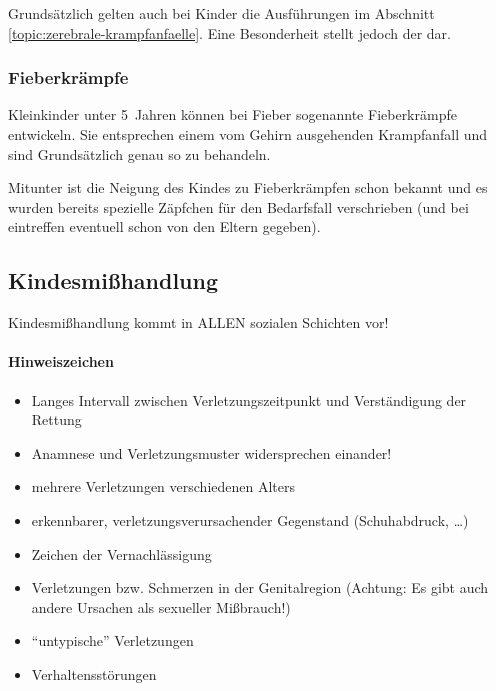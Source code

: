 Grundsätzlich gelten auch bei Kinder die Ausführungen im Abschnitt
\ref{topic:zerebrale-krampfanfaelle}. Eine Besonderheit stellt jedoch der
 dar.


\subsubsection{Fieberkrämpfe}

Kleinkinder unter 5~Jahren können bei Fieber sogenannte Fieberkrämpfe
entwickeln. Sie entsprechen einem vom Gehirn ausgehenden Krampfanfall und sind Grundsätzlich
genau so zu behandeln. 

Mitunter ist die Neigung des Kindes zu Fieberkrämpfen schon bekannt und es
wurden bereits spezielle Zäpfchen für den Bedarfsfall verschrieben (und bei
eintreffen eventuell schon von den Eltern gegeben). 




\subsection{Kindesmißhandlung}



Kindesmißhandlung kommt in ALLEN sozialen Schichten vor!

\paragraph{Hinweiszeichen}

\begin{itemize}
    \item Langes Intervall zwischen  Verletzungszeitpunkt und Verständigung der
    Rettung
    \item Anamnese und Verletzungsmuster  widersprechen einander!
    \item mehrere Verletzungen verschiedenen Alters
    \item erkennbarer, verletzungsverursachender Gegenstand (Schuhabdruck, \ldots)
    \item Zeichen der Vernachlässigung
    \item Verletzungen bzw. Schmerzen in der Genitalregion (Achtung: Es gibt auch andere
    Ursachen als sexueller Mißbrauch!)
    \item "`untypische"' Verletzungen
    \item Verhaltensstörungen
\end{itemize}


